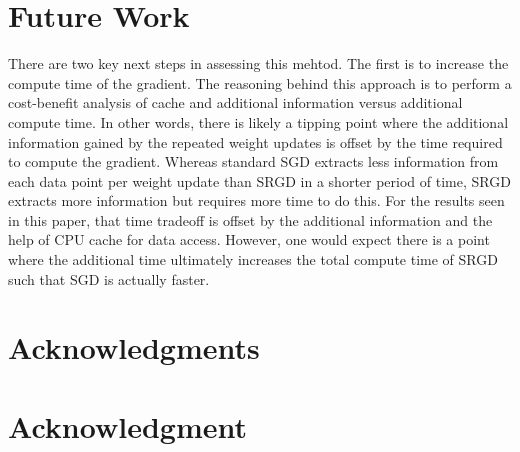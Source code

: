 \documentclass[,conference,compsoc]{IEEEtran}
\begin{document}


\section{Future Work}
There are two key next steps in assessing this mehtod. The first
is to increase the compute time of the gradient. The reasoning behind
this approach is to perform a cost-benefit analysis of cache and
additional information versus additional compute time. In other words,
there is likely a tipping point where the additional information gained
by the repeated weight updates is offset by the time required to compute
the gradient. Whereas standard SGD extracts less information from
each data point per weight update than SRGD in a shorter period of time,
SRGD extracts more information but requires more time to do this. For the
results seen in this paper, that time tradeoff is offset by the additional
information and the help of CPU cache for data access. However, one would
expect there is a point where the additional time ultimately increases
the total compute time of SRGD such that SGD is actually faster.






\ifCLASSOPTIONcompsoc
  \section*{Acknowledgments}
\else
  \section*{Acknowledgment}
\fi




\end{document}

